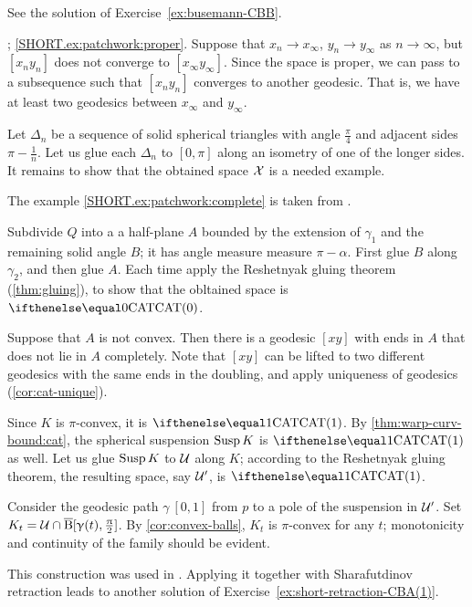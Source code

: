 See the solution of Exercise~\ref{ex:busemann-CBB}.

\parbf{\ref{ex:patchwork}}; \ref{SHORT.ex:patchwork:proper}.
Suppose that $x_n\to x_\infty$, $y_n\to y_\infty$ as $n\to\infty$,
but $[x_ny_n]$ does not converge to $[x_\infty y_\infty]$.
Since the space is proper, we can pass to a subsequence such that $[x_ny_n]$ converges to another geodesic.
That is, we have at least two geodesics between $x_\infty$ and $y_\infty$.

Let $\Delta_n$ be a sequence of solid spherical triangles 
with angle $\tfrac\pi4$ and adjacent sides $\pi-\tfrac1n$.
Let us glue each $\Delta_n$ to $[0,\pi]$ along an isometry of one of the longer sides.
It remains to show that the obtained space $\mathcal{X}$ is a needed example.

The example \ref{SHORT.ex:patchwork:complete} is taken from \cite[Chapter I, Exercise 3.14]{bridson-haefliger}.

Subdivide $Q$ into a a half-plane $A$ bounded by the extension of $\gamma_1$ and the remaining solid angle $B$; it has angle measure measure $\pi-\alpha$.
First glue $B$ along $\gamma_2$, and then glue $A$.
Each time apply the Reshetnyak gluing theorem (\ref{thm:gluing}), to show that the obltained space is $\CAT0$.

Suppose that $A$ is not convex.
Then there is a geodesic $[xy]$ with ends in $A$ that does not lie in $A$ completely.
Note that $[xy]$ can be lifted to two different geodesics with the same ends  in the doubling, and apply uniqueness of geodesics (\ref{cor:cat-unique}).

Since $K$ is $\pi$-convex, it is $\CAT1$.
By \ref{thm:warp-curv-bound:cat}, the spherical suspension $\mathop{\rm Susp}\nolimits K$ is $\CAT1$ as well.
Let us glue $\mathop{\rm Susp}\nolimits K$ to $\mathcal{U}$  along $K$;
according to the Reshetnyak gluing theorem, the resulting space, say $\mathcal{U}'$, is $\CAT1$.

Consider the geodesic path $\gamma\:[0,1]$ from $p$ to a pole of the suspension in $\mathcal{U}'$.
Set $K_t=\spc{U}\cap\cBall[\gamma(t),\tfrac\pi2]$.
By \ref{cor:convex-balls}, $K_t$ is $\pi$-convex for any $t$;
monotonicity and continuity of the family should be evident.

This construction was used in \cite{lytchak-petrunin-2020}.
Applying it together with Sharafutdinov retraction leads to another solution of Exercise~\ref{ex:short-retraction-CBA(1)}.

